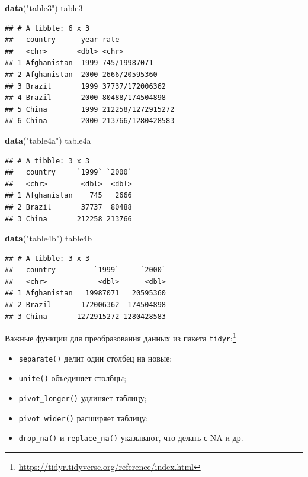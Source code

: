 \documentclass[
]{book}
\newenvironment{Shaded}{\begin{snugshade}}{\end{snugshade}}
\newcommand{\FunctionTok}[1]{\textcolor[rgb]{0.13,0.29,0.53}{\textbf{#1}}}
\newcommand{\NormalTok}[1]{#1}
\newcommand{\StringTok}[1]{\textcolor[rgb]{0.31,0.60,0.02}{#1}}
\providecommand{\tightlist}{%
  \setlength{\itemsep}{0pt}\setlength{\parskip}{0pt}}
\theoremstyle{definition}
\theoremstyle{definition}
\theoremstyle{definition}
\theoremstyle{definition}
\theoremstyle{remark}
\begin{document}
\begin{Shaded}
\begin{Highlighting}[]
\FunctionTok{data}\NormalTok{(}\StringTok{"table3"}\NormalTok{)}
\NormalTok{table3}
\end{Highlighting}
\end{Shaded}

\begin{verbatim}
## # A tibble: 6 x 3
##   country      year rate             
##   <chr>       <dbl> <chr>            
## 1 Afghanistan  1999 745/19987071     
## 2 Afghanistan  2000 2666/20595360    
## 3 Brazil       1999 37737/172006362  
## 4 Brazil       2000 80488/174504898  
## 5 China        1999 212258/1272915272
## 6 China        2000 213766/1280428583
\end{verbatim}

\begin{Shaded}
\begin{Highlighting}[]
\FunctionTok{data}\NormalTok{(}\StringTok{"table4a"}\NormalTok{)}
\NormalTok{table4a}
\end{Highlighting}
\end{Shaded}

\begin{verbatim}
## # A tibble: 3 x 3
##   country     `1999` `2000`
##   <chr>        <dbl>  <dbl>
## 1 Afghanistan    745   2666
## 2 Brazil       37737  80488
## 3 China       212258 213766
\end{verbatim}

\begin{Shaded}
\begin{Highlighting}[]
\FunctionTok{data}\NormalTok{(}\StringTok{"table4b"}\NormalTok{)}
\NormalTok{table4b}
\end{Highlighting}
\end{Shaded}

\begin{verbatim}
## # A tibble: 3 x 3
##   country         `1999`     `2000`
##   <chr>            <dbl>      <dbl>
## 1 Afghanistan   19987071   20595360
## 2 Brazil       172006362  174504898
## 3 China       1272915272 1280428583
\end{verbatim}

Важные функции для преобразования данных из пакета \texttt{tidyr}:\footnote{\url{https://tidyr.tidyverse.org/reference/index.html}}

\begin{itemize}
\tightlist
\item
  \texttt{separate()} делит один столбец на новые;
\item
  \texttt{unite()} объединяет столбцы;
\item
  \texttt{pivot\_longer()} удлиняет таблицу;
\item
  \texttt{pivot\_wider()} расширяет таблицу;
\item
  \texttt{drop\_na()} и \texttt{replace\_na()} указывают, что делать с NA и др.
\end{itemize}
\end{document}

